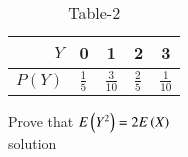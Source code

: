 \begin{enumerate}[label=\thechapter.\arabic*,ref=\thechapter.\theenumi]
\begin{table}[h!]
\begin{minipage}{0.45\linewidth}
 \begin{center}
  \caption{Table-2}
  \label{tab:ncert/12/13/3/30/}
\begin{tabular}{|r|l|c|l|c|}
\hline
$Y$ & 0 & 1 & 2 & 3\\
\hline
$P(Y)$ & $\frac{1}{5}$ & $\frac{3}{10}$ & $\frac{2}{5}$ & $\frac{1}{10}$ \\
\hline
\end{tabular}
\end{center}
\end{minipage}
\end{table}
Prove that $E\left(Y^2\right)=2E\left(X\right)$\\
solution \\

\end{enumerate}

